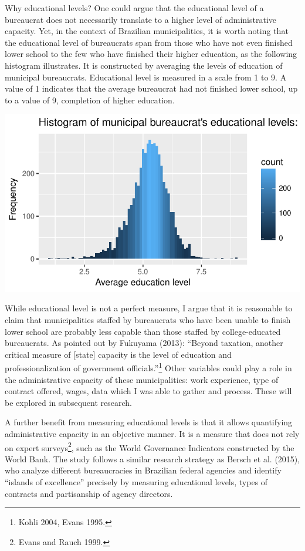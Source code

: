\documentclass[]{elsarticle} %
\makeatletter
\def\maxwidth{\ifdim\Gin@nat@width>\linewidth\linewidth
\else\Gin@nat@width\fi}
\let\Oldincludegraphics\includegraphics
\renewcommand{\includegraphics}[1]{\Oldincludegraphics[width=\maxwidth]{#1}}
\makeatother
\begin{document}
Why educational levels? One could argue that the educational level of a
bureaucrat does not necessarily translate to a higher level of
administrative capacity. Yet, in the context of Brazilian
municipalities, it is worth noting that the educational level of
bureaucrats span from those who have not even finished lower school to
the few who have finished their higher education, as the following
histogram illustrates. It is constructed by averaging the levels of
education of municipal bureaucrats. Educational level is measured in a
scale from 1 to 9. A value of 1 indicates that the average bureaucrat
had not finished lower school, up to a value of 9, completion of higher
education.

\includegraphics{First_Draft_files/figure-latex/unnamed-chunk-2-1.pdf}

While educational level is not a perfect measure, I argue that it is
reasonable to claim that municipalities staffed by bureaucrats who have
been unable to finish lower school are probably less capable than those
staffed by college-educated bureaucrats. As pointed out by Fukuyama
(2013): ``Beyond taxation, another critical measure of {[}state{]}
capacity is the level of education and professionalization of government
officials.''\footnote{Kohli 2004, Evans 1995.} Other variables could
play a role in the administrative capacity of these municipalities: work
experience, type of contract offered, wages, data which I was able to
gather and process. These will be explored in subsequent research.

A further benefit from measuring educational levels is that it allows
quantifying administrative capacity in an objective manner. It is a
measure that does not rely on expert surveys\footnote{Evans and Rauch
  1999.}, such as the World Governance Indicators constructed by the
World Bank. The study follows a similar research strategy as Bersch et
al. (2015), who analyze different bureaucracies in Brazilian federal
agencies and identify ``islands of excellence'' precisely by measuring
educational levels, types of contracts and partisanship of agency
directors.
\end{document}
